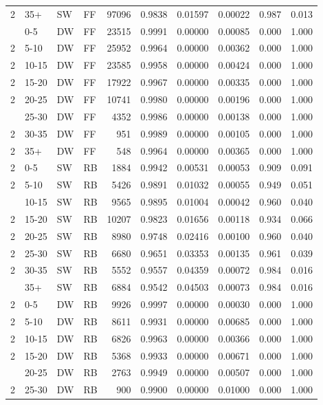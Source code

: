 \documentclass[
  11pt,
]{article}
\begin{document}
\begin{longtable}{llllrrrrrr}
2 & 35+ & SW & FF & 97096 & 0.9838 & 0.01597 & 0.00022 & 0.987 & 0.013\\
\addlinespace
2 & 0-5 & DW & FF & 23515 & 0.9991 & 0.00000 & 0.00085 & 0.000 & 1.000\\
2 & 5-10 & DW & FF & 25952 & 0.9964 & 0.00000 & 0.00362 & 0.000 & 1.000\\
2 & 10-15 & DW & FF & 23585 & 0.9958 & 0.00000 & 0.00424 & 0.000 & 1.000\\
2 & 15-20 & DW & FF & 17922 & 0.9967 & 0.00000 & 0.00335 & 0.000 & 1.000\\
2 & 20-25 & DW & FF & 10741 & 0.9980 & 0.00000 & 0.00196 & 0.000 & 1.000\\
\addlinespace
2 & 25-30 & DW & FF & 4352 & 0.9986 & 0.00000 & 0.00138 & 0.000 & 1.000\\
2 & 30-35 & DW & FF & 951 & 0.9989 & 0.00000 & 0.00105 & 0.000 & 1.000\\
2 & 35+ & DW & FF & 548 & 0.9964 & 0.00000 & 0.00365 & 0.000 & 1.000\\
2 & 0-5 & SW & RB & 1884 & 0.9942 & 0.00531 & 0.00053 & 0.909 & 0.091\\
2 & 5-10 & SW & RB & 5426 & 0.9891 & 0.01032 & 0.00055 & 0.949 & 0.051\\
\addlinespace
2 & 10-15 & SW & RB & 9565 & 0.9895 & 0.01004 & 0.00042 & 0.960 & 0.040\\
2 & 15-20 & SW & RB & 10207 & 0.9823 & 0.01656 & 0.00118 & 0.934 & 0.066\\
2 & 20-25 & SW & RB & 8980 & 0.9748 & 0.02416 & 0.00100 & 0.960 & 0.040\\
2 & 25-30 & SW & RB & 6680 & 0.9651 & 0.03353 & 0.00135 & 0.961 & 0.039\\
2 & 30-35 & SW & RB & 5552 & 0.9557 & 0.04359 & 0.00072 & 0.984 & 0.016\\
\addlinespace
2 & 35+ & SW & RB & 6884 & 0.9542 & 0.04503 & 0.00073 & 0.984 & 0.016\\
2 & 0-5 & DW & RB & 9926 & 0.9997 & 0.00000 & 0.00030 & 0.000 & 1.000\\
2 & 5-10 & DW & RB & 8611 & 0.9931 & 0.00000 & 0.00685 & 0.000 & 1.000\\
2 & 10-15 & DW & RB & 6826 & 0.9963 & 0.00000 & 0.00366 & 0.000 & 1.000\\
2 & 15-20 & DW & RB & 5368 & 0.9933 & 0.00000 & 0.00671 & 0.000 & 1.000\\
\addlinespace
2 & 20-25 & DW & RB & 2763 & 0.9949 & 0.00000 & 0.00507 & 0.000 & 1.000\\
2 & 25-30 & DW & RB & 900 & 0.9900 & 0.00000 & 0.01000 & 0.000 & 1.000\\

\end{longtable}
\end{document}

